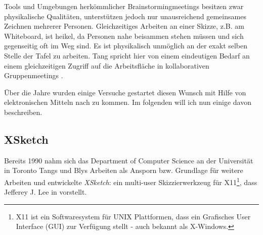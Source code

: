 
Tools und Umgebungen herkömmlicher Brainstormingmeetings besitzen zwar physikalische Qualitäten, unterstützen jedoch nur unausreichend gemeinsames Zeichnen mehrerer Personen. Gleichzeitiges Arbeiten an einer Skizze, z.B. am Whiteboard, ist heikel, da Personen nahe beisammen stehen müssen und sich gegenseitig oft im Weg sind. Es ist physikalisch unmöglich an der exakt selben Stelle der Tafel zu arbeiten. Tang spricht hier von einem eindeutigen Bedarf an einem gleichzeitigen Zugriff auf die Arbeitsfläche in kollaborativen Gruppenmeetings \citep{Tang1991143}.

Über die Jahre wurden einige Versuche gestartet diesen Wunsch mit Hilfe von elektronischen Mitteln nach zu kommen. Im folgenden will ich nun einige davon beschreiben.

\subsection{XSketch}
Bereits 1990 nahm sich das Department of Computer Science an der Universität in Toronto Tangs und Blys Arbeiten als Ansporn bzw. Grundlage für weitere Arbeiten und entwickelte \emph{XSketch}: ein multi-user Skizzierwerkzeug für X11\footnote{X11 ist ein Softwaresystem für UNIX Plattformen, dass ein Grafisches User Interface (GUI) zur Verfügung stellt - auch bekannt als X-Windows.}, dass Jefferey J. Lee in \citep{Lee:1990:XMS:91478.91510} vorstellt.

